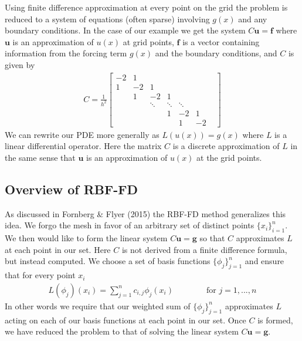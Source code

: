 \documentclass[12pt]{article}
\let\vec\mathbf
\begin{document}
Using finite difference approximation at every point on the grid the problem is reduced to a system of equations (often sparse) involving $g(x)$ and any boundary conditions. In the case of our example we get the system $C\vec{u} = \vec{f}$ where $\vec{u}$ is an approximation of $u(x)$ at grid points, $\vec{f}$ is a vector containing information from the forcing term $g(x)$ and the boundary conditions, and $C$ is given by
\begin{align*}
	C = 
	\frac{1}{h^2}\begin{bmatrix}
		-2 & 1  &     &   &  &  &\\
		1 & -2 &  1  &   &  &  &\\
		& 1  &  -2 & 1 &  &  &\\
		&    & \ddots & \ddots & \ddots&\\
		&    &     & 1 & -2 & 1  \\
		&    &     &   &  1 & -2
	\end{bmatrix}
\end{align*}
We can rewrite our PDE more generally as $L(u(x))=g(x)$ where $L$ is a linear differential operator. Here the matrix $C$ is a discrete approximation of $L$ in the same sense that $\vec{u}$ is an approximation of $u(x)$ at the grid points.

\subsection{Overview of RBF-FD}	
As discussed in Fornberg \& Flyer (2015)\cite{Fornberg2015} the RBF-FD method generalizes this idea. We forgo the mesh in favor of an arbitrary set of distinct points $\{x_i\}_{i=1}^n$. We then would like to form the linear system $C\vec{u} = \vec{g}$ so that $C$ approximates $L$ at each point in our set. Here $C$ is not derived from a finite difference formula, but instead computed. We choose a set of basis functions $\{\phi_j\}_{j=1}^n$ and ensure that for every point $x_i$
\begin{align}
	L(\phi_j)(x_i) = \sum\limits_{j=1}^{n} c_{i,j} \phi_j(x_i) \phantom{===} \text{for } j=1,...,n \label{row_coef}
\end{align}
In other words we require that our weighted sum of $\{\phi_j\}_{j=1}^n$ approximates $L$ acting on each of our basis functions at each point in our set. Once $C$ is formed, we have reduced the problem to that of solving the linear system $C\vec{u} = \vec{g}$. \bigbreak

\end{document}
